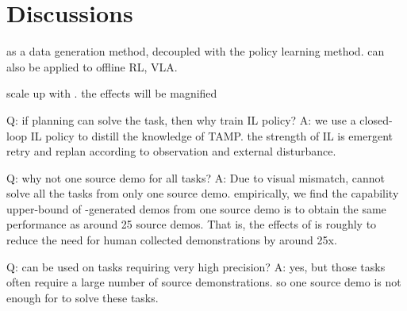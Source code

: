 \section{Discussions}
as a data generation method, decoupled with the policy learning method. can also be applied to offline RL, VLA.

scale up with \method. the effects will be magnified

Q: if planning can solve the task, then why train IL policy? A: we use a closed-loop IL policy to distill the knowledge of TAMP. the strength of IL is emergent retry and replan according to observation and external disturbance.

Q: why not one source demo for all tasks? A: Due to visual mismatch, \method cannot solve all the tasks from only one source demo. empirically, we find the capability upper-bound of \method-generated demos from one source demo is to obtain the same performance as around 25 source demos. That is, the effects of \method is roughly to reduce the need for human collected demonstrations by around 25x. 

Q: can \method be used on tasks requiring very high precision? A: yes, but those tasks often require a large number of source demonstrations. so one source demo is not enough for \method to solve these tasks.
